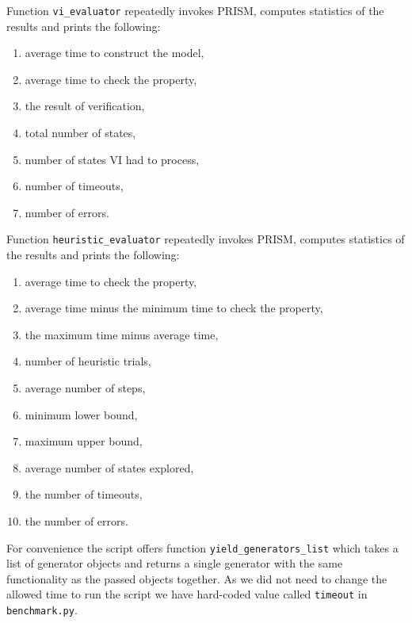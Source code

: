 \pagebreak

Function \verb|vi_evaluator| repeatedly invokes PRISM, computes
statistics of the results and prints the following:
\begin{enumerate}
    \item average time to construct the model,
    \item average time to check the property,
    \item the result of verification,
    \item total number of states,
    \item number of states VI had to process,
    \item number of timeouts,
    \item number of errors.
\end{enumerate}

Function \verb|heuristic_evaluator| repeatedly invokes PRISM, computes
statistics of the results and prints the following:
\begin{enumerate}
    \item average time to check the property,
    \item average time minus the minimum time to check the property,
    \item the maximum time minus average time,
    \item number of heuristic trials,
    \item average number of steps,
    \item minimum lower bound,
    \item maximum upper bound,
    \item average number of states explored,
    \item the number of timeouts,
    \item the number of errors.
\end{enumerate}

For convenience the script offers function \verb|yield_generators_list|
which takes a list of generator objects and returns a single generator
with the same functionality as the passed objects together.
As we did not need to change the allowed time to run the script we have
hard-coded value called \verb|timeout| in \verb|benchmark.py|.
